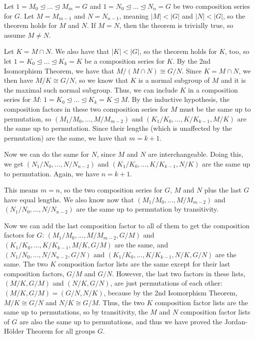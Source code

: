 \documentclass[fleqn]{article}
\begin{document}
        Let $1 = M_0 \unlhd ... \unlhd M_m = G$ and $1 = N_0 \unlhd ... \unlhd N_n = G$ be two composition series for $G$.  Let $M = M_{m - 1}$ and $N = N_{n - 1}$, meaning $|M| < |G|$ and $|N| < |G|$, so the theorem holds for $M$ and $N$.  If $M = N$, then the theorem is trivially true, so assume $M \neq N$.  
        
        Let $K = M \cap N$.  We also have that $|K| < |G|$, so the theorem holds for $K$, too, so let $1 = K_0 \unlhd ... \unlhd K_k = K$ be a composition series for $K$.  By the 2nd Isomorphism Theorem, we have that $M/(M \cap N) \cong G/N$.  Since $K = M \cap N$, we then have $M/K \cong G/N$, so we know that $K$ is a normal subgroup of $M$ and it is the maximal such normal subgroup.  Thus, we can include $K$ in a composition series for $M$: $1 = K_0 \unlhd ... \unlhd K_k = K \unlhd M$.  
        By the inductive hypothesis, the composition factors in these two composition series for $M$ must be the same up to permutation, so $(M_1/M_0, ..., M/M_{m - 2})$ and $(K_1/K_0, ..., K/K_{k - 1}, M/K)$ are the same up to permutation.  Since their lengths (which is unaffected by the permutation) are the same, we have that $m = k + 1$.
        
        Now we can do the same for $N$, since $M$ and $N$ are interchangeable.  Doing this, we get $(N_1/N_0, ..., N/N_{n - 2})$ and $(K_1/K_0, ..., K/K_{k - 1}, N/K)$ are the same up to permutation.  Again, we have $n = k + 1$.
        
        This means $m = n$, so the two composition series for $G$, $M$ and $N$ plus the last $G$ have equal lengths.  We also know now that $(M_1/M_0, ..., M/M_{m - 2})$ and $(N_1/N_0, ..., N/N_{n - 2})$ are the same up to permutation by transitivity.  
        
        Now we can add the last composition factor to all of them to get the composition factors for $G$: $(M_1/M_0, ..., M/M_{m - 2}, G/M)$ and $(K_1/K_0, ..., K/K_{k - 1}, M/K, G/M)$ are the same, and $(N_1/N_0, ..., N/N_{n - 2}, G/N)$ and $(K_1/K_0, ..., K/K_{k - 1}, N/K, G/N)$ are the same.  The two $K$ composition factor lists are the same except for their last composition factors, $G/M$ and $G/N$.  However, the last two factors in these lists, $(M/K, G/M)$ and $(N/K, G/N)$, are just permutations of each other: $(M/K, G/M) = (G/N, N/K)$, because by the 2nd Isomorphism Theorem, $M/K \cong G/N$ and $N/K \cong G/M$.  Thus, the two $K$ composition factor lists are the same up to permutations, so by transitivity, the $M$ and $N$ composition factor lists of $G$ are also the same up to permutations, and thus we have proved the Jordan-Hölder Theorem for all groups $G$.
        
    
\end{document}

